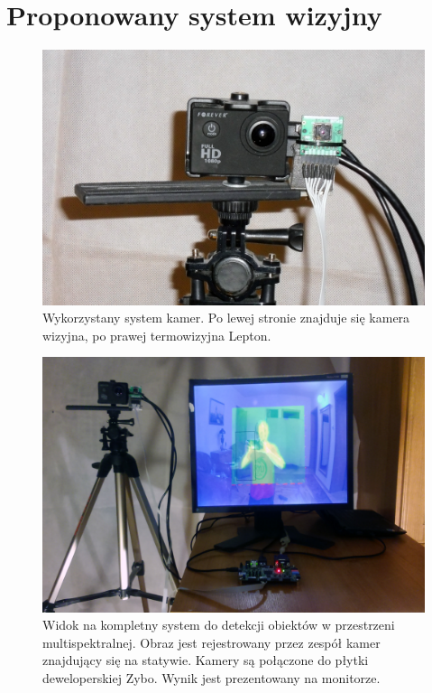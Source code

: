 \chapter{Proponowany system wizyjny}
\label{cha:propSysWiz}

\begin{figure}
\centering
\includegraphics[width=0.65\linewidth]{images/kameraRGBIR.jpg}
\caption[Wykożystany system kamer.]{Wykorzystany system kamer. Po lewej stronie znajduje się kamera wizyjna, po prawej termowizyjna Lepton.}
\label{fig:kameraRGBIR}
\end{figure}

\begin{figure}
\centering
\includegraphics[width=0.65\linewidth]{images/systemOverview.jpg}
\caption[Widok na kompletny system.]{Widok na kompletny system do detekcji obiektów w przestrzeni multispektralnej. Obraz jest rejestrowany przez zespół kamer znajdujący się na statywie. Kamery są połączone do płytki deweloperskiej Zybo. Wynik jest prezentowany na monitorze.}
\label{fig:systemOverview}
\end{figure}

